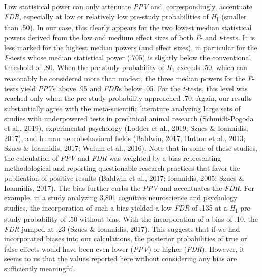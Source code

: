 \documentclass[authordate, meta]{jote-new-article}
\begin{document}
	Low statistical power can only attenuate \emph{PPV} and, correspondingly, accentuate \emph{FDR}, especially at low or relatively low pre-study probabilities of \emph{H}\textsubscript{1} (smaller than .50). In our case, this clearly appears for the two lowest median statistical powers derived from the low and medium effect sizes of both \emph{F}- and \emph{t}-tests. It is less marked for the highest median powers (and effect sizes), in particular for the \emph{F}-tests whose median statistical power (.705) is slightly below the conventional threshold of .80. When the pre-study probability of \emph{H}\textsubscript{1} exceeds .50, which can reasonably be considered more than modest, the three median powers for the \emph{F}-tests yield \emph{PPV}s above .95 and \emph{FDR}s below .05. For the \emph{t-}tests, this level was reached only when the pre-study probability approached .70. Again, our results substantially agree with the meta-scientific literature analyzing large sets of studies with underpowered tests in preclinical animal research (Schmidt-Pogoda et al., 2019), experimental psychology (Lodder et al., 2019; Szucs \& Ioannidis, 2017), and human neurobehavioral fields (Baldwin, 2017; Button et al., 2013; Szucs \& Ioannidis, 2017; Walum et al., 2016). Note that in some of these studies, the calculation of \emph{PPV} and \emph{FDR} was weighted by a bias representing methodological and reporting questionable research practices that favor the publication of positive results (Baldwin et al., 2017; Ioannidis, 2005; Szucs \& Ioannidis, 2017). The bias further curbs the \emph{PPV} and accentuates the \emph{FDR}. For example, in a study analyzing 3,801 cognitive neuroscience and psychology studies, the incorporation of such a bias yielded a low \emph{FDR} of .135 at a \emph{H}\textsubscript{1} pre-study probability of .50 without bias. With the incorporation of a bias of .10, the \emph{FDR} jumped at .23 (Szucs \& Ioannidis, 2017). This suggests that if we had incorporated biases into our calculations, the posterior probabilities of true or false effects would have been even lower (\emph{PPV}) or higher (\emph{FDR}). However, it seems to us that the values reported here without considering any bias are sufficiently meaningful.
\end{document}
